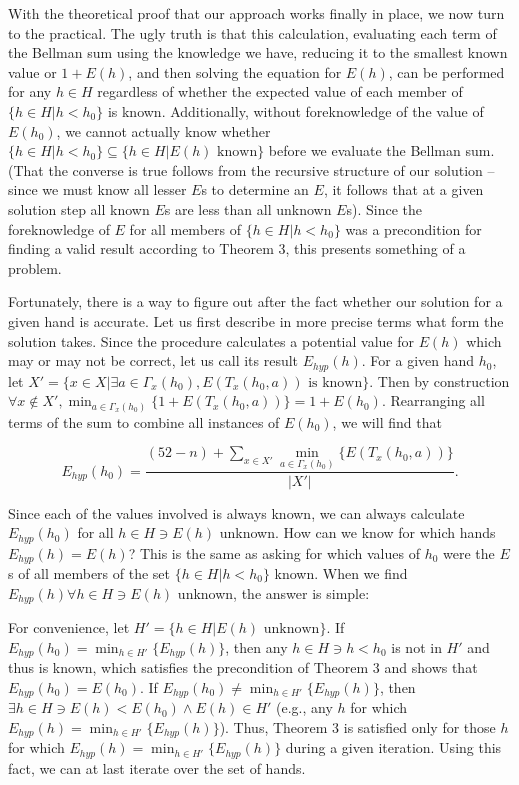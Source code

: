 \documentclass[letter,12pt]{article}
\begin{document}
With the theoretical proof that our approach works finally in place, we now turn to the practical. The ugly truth is that this calculation, evaluating each term of the Bellman sum using the knowledge we have, reducing it to the smallest known value or $1+E(h)$, and then solving the equation for $E(h)$, can be performed for any $h \in H$ regardless of whether the expected value of each member of $\{h \in H | h < h_0\}$ is known. Additionally, without foreknowledge of the value of $E(h_0)$, we cannot actually know whether $\{h \in H |h < h_0\} \subseteq \{h \in H | E(h) \textrm{ known}\}$ before we evaluate the Bellman sum. (That the converse is true follows from the recursive structure of our solution – since we must know all lesser $E$s to determine an $E$, it follows that at a given solution step all known $E$s are less than all unknown $E$s). Since the foreknowledge of $E$ for all members of $\{h \in H | h < h_0\}$ was a precondition for finding a valid result according to Theorem 3, this presents something of a problem. 

Fortunately, there is a way to figure out after the fact whether our solution for a given hand is accurate. Let us first describe in more precise terms what form the solution takes. Since the procedure calculates a potential value for $E(h)$ which may or may not be correct, let us call its result $E_{hyp}(h)$. For a given hand $h_0$, let $X' = \{x \in X | \exists a \in \Gamma_x(h_0), E(T_x(h_0,a)) \textrm{ is known}\}$. Then by construction $\forall x \notin X', \min_{a \in \Gamma_x(h_0)}\{1+E(T_x(h_0,a))\}=1+E(h_0)$. Rearranging all terms of the sum to combine all instances of $E(h_0)$, we will find that 

$$E_{hyp}(h_0) = \frac{(52-n)+\sum_{x\in X'}\min_{a \in \Gamma_x(h_0)}\{E(T_x(h_0,a))\}}{|X'|}.$$

Since each of the values involved is always known, we can always calculate $E_{hyp}(h_0)$ for all $h \in H \ni E(h)$ unknown. How can we know for which hands $E_{hyp}(h) = E(h)$? This is the same as asking for which values of $h_0$ were the $E$s of all members of the set $\{h \in H | h < h_0\}$ known. When we find $E_{hyp}(h) \forall h \in H \ni E(h)$ unknown, the answer is simple:

For convenience, let $H' = \{h \in H | E(h) \textrm{ unknown}\}$. If $E_{hyp}(h_0) = \min_{h \in H'}\{E_{hyp}(h)\}$, then any $h \in H \ni h < h_0$ is not in $H'$ and thus is known, which satisfies the precondition of Theorem 3 and shows that $E_{hyp}(h_0) = E(h_0)$. If $E_{hyp}(h_0) \ne \min_{h \in H'}\{E_{hyp}(h)\}$, then $\exists h \in H \ni E(h) < E(h_0) \wedge E(h) \in H'$ (e.g., any $h$ for which $E_{hyp}(h) = \min_{h \in H'}\{E_{hyp}(h)\}$). Thus, Theorem 3 is satisfied only for those $h$ for which $E_{hyp}(h) = \min_{h \in H'}\{E_{hyp}(h)\}$ during a given iteration. Using this fact, we can at last iterate over the set of hands.
\end{document}
